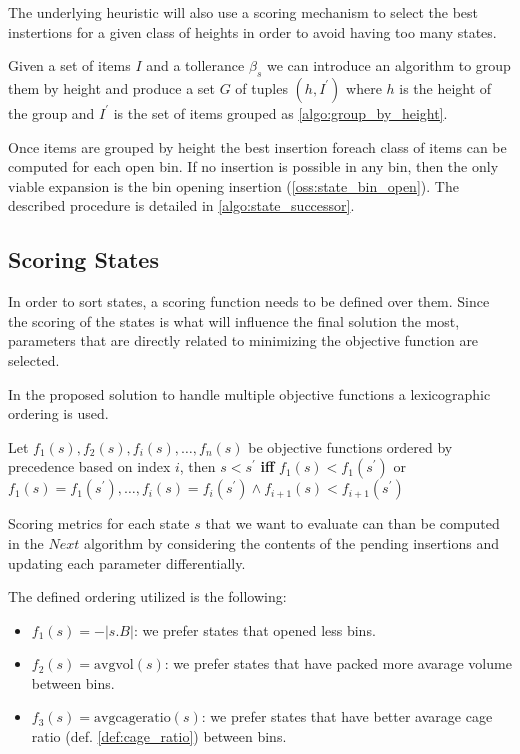 The underlying heuristic will also use a scoring mechanism to select the best instertions for a given class of heights in order to avoid having too many states.

Given a set of items $I$ and a tollerance $\beta_s$ we can introduce an algorithm to group them by height and produce a set $G$ of tuples $(h, I^\prime)$ where $h$ is the height of the group and $I^\prime$ is the set of items grouped as \cref{algo:group_by_height}.



Once items are grouped by height the best insertion foreach class of items can be computed for each open bin. If no insertion is possible in any bin, then the only viable expansion is the bin opening insertion (\cref{oss:state_bin_open}).
The described procedure is detailed in \cref{algo:state_successor}.



\subsection{Scoring States}
\label{ssec:scoring_states}%
In order to sort states, a scoring function needs to be defined over them.
Since the scoring of the states is what will influence the final solution the most, parameters that are directly related to minimizing the objective function are selected.

In the proposed solution to handle multiple objective functions a lexicographic ordering is used.
\begin{definition}
    \label{def:lexicographic_ordering}
    Let $f_1(s), f_2(s), f_i(s), \dots, f_n(s)$ be objective functions ordered by precedence based on index $i$, then $s < s^\prime$ \textbf{iff} $f_1(s) < f_1(s^\prime)$ or $f_1(s) = f_1(s^\prime), \dots, f_i(s) = f_i(s^\prime) \land f_{i+1}(s) < f_{i+1}(s^\prime)$
\end{definition}

Scoring metrics for each state $s$ that we want to evaluate can than be computed in the $Next$ algorithm by considering the contents of the pending insertions and updating each parameter differentially.

The defined ordering utilized is the following:
\begin{itemize}
    \item $f_1(s) = -|s.B|$: we prefer states that opened less bins.
    \item $f_2(s) = \text{avgvol}(s)$: we prefer states that have packed more avarage volume between bins.
    \item $f_3(s) = \text{avgcageratio}(s)$: we prefer states that have better avarage cage ratio (def. \ref{def:cage_ratio}) between bins.
\end{itemize}

